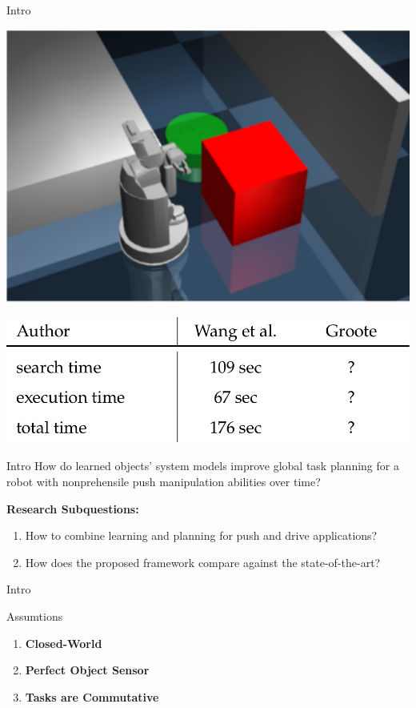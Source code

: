 \begin{frame}[fragile]{Intro}
  \begin{minipage}[l]{0.46\textwidth}
    \includegraphics[width=1.3\textwidth]{figures/introduction/wang}
  \end{minipage}
  \begin{minipage}[l]{0.3\textwidth}
    \includegraphics[width=1.8\textwidth]{figures/introduction/wang_groote_table}
    \vspace{3.0cm}
  \end{minipage}

\end{frame}

\begin{frame}[fragile]{Intro}
    \large
    How do learned objects' system models improve global task planning for a robot with nonprehensile push manipulation abilities over time? \bs

  \textbf{Research Subquestions:}

  \begin{enumerate}
    \item\small How to combine learning and planning for push and drive applications?
    \item\small How does the proposed framework compare against the state-of-the-art?
  \end{enumerate}
\end{frame}

\begin{frame}[fragile]{Intro}
  \begin{block}{Assumtions}
    \begin{enumerate}
      \item \textbf{Closed-World}\pause
      \item\textbf{Perfect Object Sensor}\pause
      \item\textbf{Tasks are Commutative}
    \end{enumerate}
  \end{block}
\end{frame}
